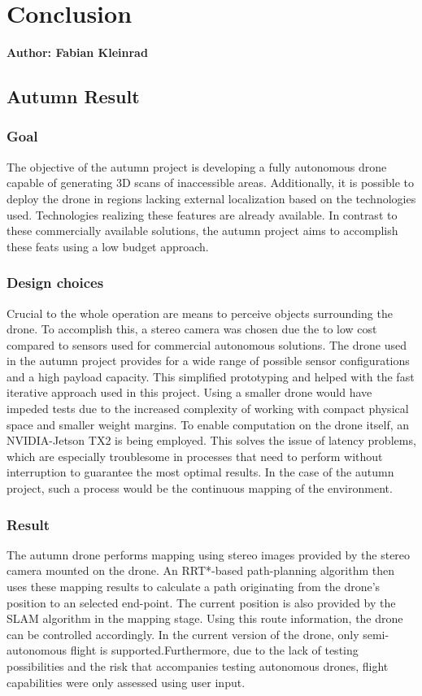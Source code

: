 \chapter{Conclusion}

\textbf{Author: Fabian Kleinrad} 

\section{Autumn Result}

\subsection{Goal}
The objective of the autumn project is developing a fully autonomous drone capable of generating 3D scans of inaccessible areas. Additionally, it is possible to deploy the drone in regions lacking external localization based on the technologies used. Technologies realizing these features are already available. In contrast to these commercially available solutions, the autumn project aims to accomplish these feats using a low budget approach. 

\subsection{Design choices}
Crucial to the whole operation are means to perceive objects surrounding the drone. To accomplish this, a stereo camera was chosen due the to low cost compared to sensors used for commercial autonomous solutions.\newline
The drone used in the autumn project provides for a wide range of possible sensor configurations and a high payload capacity. This simplified prototyping and helped with the fast iterative approach used in this project. Using a smaller drone would have impeded tests due to the increased complexity of working with compact physical space and smaller weight margins.\newline
To enable computation on the drone itself, an NVIDIA-Jetson TX2 is being employed. This solves the issue of latency problems, which are especially troublesome in processes that need to perform without interruption to guarantee the most optimal results. In the case of the autumn project, such a process would be the continuous mapping of the environment.
\pagebreak
\subsection{Result}
The autumn drone performs mapping using stereo images provided by the stereo camera mounted on the drone. An RRT*-based path-planning algorithm then uses these mapping results to calculate a path originating from the drone's position to an selected end-point. The current position is also provided by the SLAM algorithm in the mapping stage. Using this route information, the drone can be controlled accordingly.
In the current version of the drone, only semi-autonomous flight is supported.Furthermore, due to the lack of testing possibilities and the risk that accompanies testing autonomous drones, flight capabilities were only assessed using user input.

